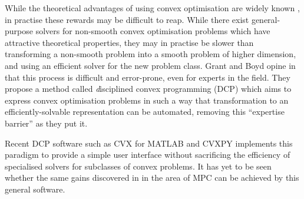 While the theoretical advantages of using convex optimisation are widely known
\cite{Luo06}, in practise these rewards may be difficult to reap. While there
exist general-purpose solvers for non-smooth convex optimisation problems which
have attractive theoretical properties, they may in practise be slower than
transforming a non-smooth problem into a smooth problem of higher dimension,
and using an efficient solver for the new problem class. Grant and Boyd opine
in \cite{Grant08} that this process is difficult and error-prone, even for
experts in the field. They propose a method called {\emph disciplined convex
programming} (DCP) \cite{Grant06} which aims to express convex optimisation
problems in such a way that transformation to an efficiently-solvable
representation can be automated, removing this ``expertise barrier'' as they
put it.

Recent DCP software such as CVX for MATLAB \cite{CVX} and CVXPY \cite{CVXPY}
implements this paradigm to provide a simple user interface without sacrificing
the efficiency of specialised solvers for subclasses of convex problems.
{\opinion It has yet to be seen whether the same gains discovered in
\cite{Wang10} in the area of MPC can be achieved by this general software.}
